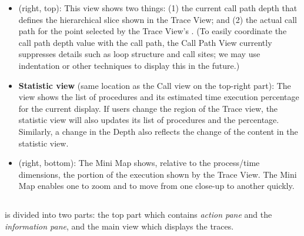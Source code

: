 \begin{itemize}
\item \textbf{\callview} (right, top):
  This view shows two things: (1) the current call path depth that defines the hierarchical slice shown in the Trace View; and (2) the actual call path for the point selected by the Trace View's \crosshair{}.
  (To easily coordinate the call path depth value with the call path, the Call Path View currently suppresses details such as loop structure and call sites; we may use indentation or other techniques to display this in the future.)

\item \textbf{Statistic view} (same location as the Call view on the top-right part):
  The view shows the list of procedures and its estimated time execution percentage for the current display. If users change the region of the Trace view, the statistic view will also updates its list of procedures and the percentage. Similarly, a change in the Depth also reflects the change of the content in the statistic view.

\item \textbf{\miniview} (right, bottom):
  The Mini Map shows, relative to the process/time dimensions, the portion of the execution shown by the Trace View.
  The Mini Map enables one to zoom and to move from one close-up to another quickly.

\end{itemize}


\subsection{\traceview}
\label{sec:traceview}

\traceview{} is divided into two parts: the top part which contains \emph{action pane} and the \emph{information pane}, and the main view which displays the traces. 

